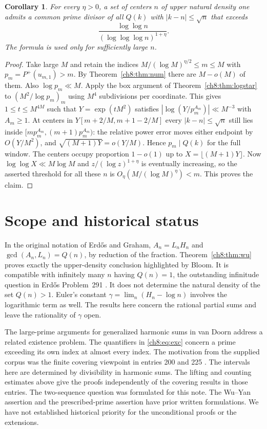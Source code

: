 \documentclass[11pt,a4paper,oneside,openany]{report}
\newtheorem{corollary}[theorem]{Corollary}
\theoremstyle{remark}\newtheorem{remark}[theorem]{Remark}
\numberwithin{equation}{section}
\begin{document}
\begin{corollary}\label{ch8:cor:size}
For every $\eta>0$, a set of centers $n$ of upper natural density one admits a common prime divisor of all $Q(k)$ with $|k-n|\le\sqrt n$ that exceeds
\[
                \frac{\log\log n}{(\log\log\log n)^{1+\eta}} .
\]
The formula is used only for sufficiently large $n$.
\end{corollary}
\begin{proof}
Take large $M$ and retain the indices $M/(\log M)^{\eta/2}\le m\le M$ with $p_m=P^+(u_{m,1})>m$. By Theorem~\ref{ch8:thm:num} there are $M-o(M)$ of them. Also $\log p_m\ll M$. Apply the box argument of Theorem~\ref{ch8:thm:logstar} to $(M^2/\log p_m)_m$ using $M^4$ subdivisions per coordinate. This gives $1\le t\le M^{4M}$ such that $Y=\exp(tM^2)$ satisfies $|\log(Y/p_m^{A_m})|\ll M^{-3}$ with $A_m\ge1$. At centers in $Y[m+2/M,m+1-2/M]$ every $|k-n|\le\sqrt n$ still lies inside $[mp_m^{A_m},(m+1)p_m^{A_m})$: the relative power error moves either endpoint by $O(Y/M^2)$, and $\sqrt{(M+1)Y}=o(Y/M)$. Hence $p_m\mid Q(k)$ for the full window. The centers occupy proportion $1-o(1)$ up to $X=\lfloor(M+1)Y\rfloor$. Now $\log\log X\ll M\log M$ and $z/(\log z)^{1+\eta}$ is eventually increasing, so the asserted threshold for all these $n$ is $O_\eta(M/(\log M)^\eta)<m$. This proves the claim.
\end{proof}

\section*{Scope and historical status}
In the original notation of Erd\H{o}s and Graham, $A_n=L_n H_n$ and $\gcd(A_n,L_n)=Q(n)$, by reduction of the fraction. Theorem~\ref{ch8:thm:wu} proves exactly the upper-density conclusion highlighted by Bloom. It is compatible with infinitely many $n$ having $Q(n)=1$, the outstanding infinitude question in Erd\H{o}s Problem~291 \cite{eg,bloom}. It does not determine the natural density of the set $Q(n)>1$. Euler's constant $\gamma=\lim_n(H_n-\log n)$ involves the logarithmic term as well. The results here concern the rational partial sums and leave the rationality of $\gamma$ open.

The large-prime arguments for generalized harmonic sums in van Doorn \cite[Section 2.5]{vd} address a related existence problem. The quantifiers in \eqref{ch8:eq:exc} concern a prime exceeding its own index at almost every index. The motivation from the supplied corpus was the finite covering viewpoint in entries 200 and 225 \cite{corpus}. The intervals here are determined by divisibility in harmonic sums. The lifting and counting estimates above give the proofs independently of the covering results in those entries. The two-sequence question was formulated for this note. The Wu--Yan assertion and the prescribed-prime assertion have prior written formulations. We have not established historical priority for the unconditional proofs or the extensions.
\end{document}
